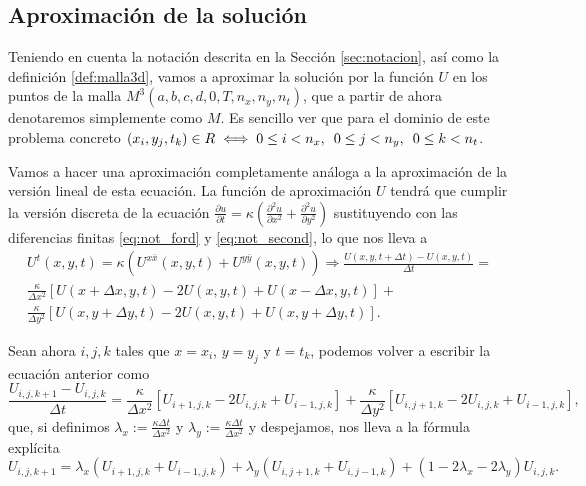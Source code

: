 \subsection{Aproximación de la solución}
Teniendo en cuenta la notación descrita en la Sección \ref{sec:notacion}, así como la definición \ref{def:malla3d}, vamos a aproximar la solución por la función $U$ en los puntos de la malla $M^3(a,b,c,d,0,T,n_x,n_y,n_t)$, que a partir de ahora denotaremos simplemente como $M$. Es sencillo ver que para el dominio de este problema concreto $(x_i,y_j,t_k)\in R \iff 0\leq i < n_x, \hspace{5px} 0\leq j < n_y, \hspace{5px} 0 \leq k < n_t$.

Vamos a hacer una aproximación completamente análoga a la aproximación de la versión lineal de esta ecuación. La función de aproximación $U$ tendrá que cumplir la versión discreta de la ecuación $\frac{\partial u}{\partial t}=\kappa(\frac{\partial^2u}{\partial x^2}+\frac{\partial^2u}{\partial y^2})$ sustituyendo con las diferencias finitas \eqref{eq:not_ford} y \eqref{eq:not_second}, lo que nos lleva a
\begin{multline}
	U^t(x,y,t)=\kappa\left(U^{x\bar{x}}(x,y,t)+U^{y\bar{y}}(x,y,t)\right) \Rightarrow 
	\frac{U(x,y,t+\Delta t)-U(x,y,t)}{\Delta t} = \\ \frac{\kappa}{\Delta x^2}[U(x+\Delta x,y,t) - 2U(x,y,t) + U(x-\Delta x,y,t)] + \\ \frac{\kappa}{\Delta y^2}[U(x,y+\Delta y,t) -2U(x,y,t) + U(x,y + \Delta y, t)].
\end{multline}

Sean ahora $i,j,k$ tales que $x=x_i$, $y=y_j$ y $t=t_k$, podemos volver a escribir la ecuación anterior como 
\begin{equation}
	\frac{U_{i,j,k+1}-U_{i,j,k}}{\Delta t} = \frac{\kappa}{\Delta x^2}\left[ U_{i+1,j,k} - 2U_{i,j,k} + U_{i-1,j,k} \right] + \frac{\kappa}{\Delta y^2}\left[ U_{i,j+1,k} - 2U_{i,j,k} + U_{i-1,j,k}\right],
\end{equation}
que, si definimos $\lambda_x:=\frac{\kappa\Delta t}{\Delta x^2}$ y $\lambda_y:= \frac{\kappa \Delta t}{\Delta x^2}$ y despejamos, nos lleva a la fórmula explícita
\begin{equation}\label{eq:2dheat_formula}
	U_{i,j,k+1} = \lambda_x(U_{i+1,j,k} + U_{i-1,j,k}) + \lambda_y( U_{i,j+1,k} + U_{i,j-1,k}) + \left(1 - 2\lambda_x -2\lambda_y \right)U_{i,j,k}.
\end{equation}

